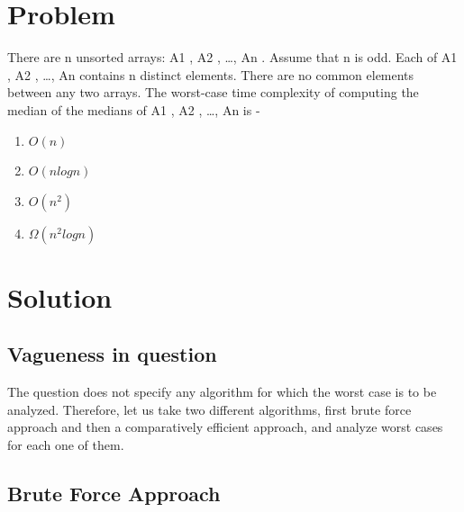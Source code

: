 \documentclass[journal,12pt,twocolumn]{IEEEtran}
\begin{document}
\section{Problem}
There are n unsorted arrays: A1 , A2 , …, An . Assume that n is odd. Each of A1 , A2 , …, An
contains n distinct elements. There are no common elements between any two arrays. The
worst-case time complexity of computing the median of the medians of A1 , A2 , …, An is -

\begin{enumerate}
    \item $O(n)$
    \item $O(nlogn)$
    \item  $O(n^{2})$
    \item $\Omega(n^{2}log n)$
\end{enumerate}



\section{Solution}
\subsection{Vagueness in question}
The question does not specify any algorithm for which the worst case is to be analyzed. Therefore, let us take two different algorithms, first brute force approach and then a comparatively efficient approach, and analyze worst cases for each one of them.


\subsection{Brute Force Approach}
\end{document}
